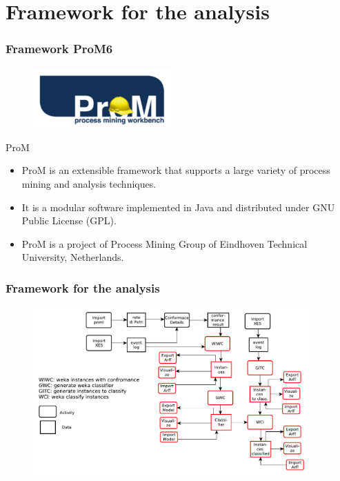\documentclass[10pt]{beamer}
\begin{document}
\section{Framework for the analysis}
\begin{frame}
\frametitle{Framework ProM6}
\begin{figure}
\includegraphics[width=150pt]{./item/prom.pdf}
\end{figure}
\begin{block}{ProM}
\begin{itemize}
\item ProM is an extensible framework that supports a large variety of process mining and analysis techniques.
\item It is a modular software implemented in Java and distributed under GNU Public License (GPL).
\item ProM is a project of Process Mining Group of Eindhoven Technical University, Netherlands.
\end{itemize}
\end{block}
\end{frame}

\begin{frame}
\frametitle{Framework for the analysis}
\begin{figure}
\includegraphics[width=300pt]{./item/worklow.pdf}
\end{figure}
\end{frame}
\end{document}
